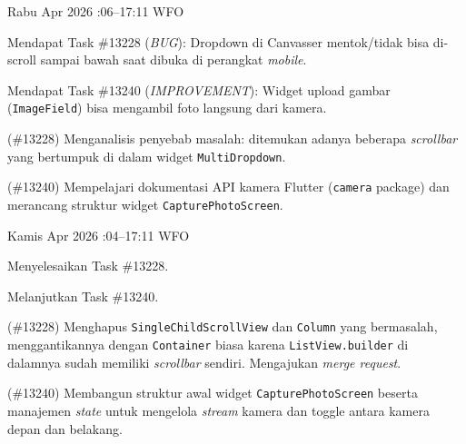 \begin{logtable}
    {
        Rabu  Apr 2026 :06--17:11 \linebreak %
        WFO
    }{
        \begin{loglist}
            \item Mendapat Task \#13228 (\textit{BUG}): Dropdown di Canvasser mentok/tidak bisa
            di-scroll sampai bawah saat dibuka di perangkat \textit{mobile}.
            \item Mendapat Task \#13240 (\textit{IMPROVEMENT}): Widget upload gambar
            (\texttt{ImageField}) bisa mengambil foto langsung dari kamera.
        \end{loglist}
    }{
        \begin{logwork}
            \item (\#13228) Menganalisis penyebab masalah: ditemukan adanya beberapa \textit{scrollbar} yang bertumpuk di dalam widget \texttt{MultiDropdown}.
            \item (\#13240) Mempelajari dokumentasi API kamera Flutter (\texttt{camera} package) dan merancang struktur widget \texttt{CapturePhotoScreen}.
        \end{logwork}
    }

    {
        Kamis  Apr 2026 :04--17:11 \linebreak %
        WFO
    }{
        \begin{loglist}
            \item Menyelesaikan Task \#13228.
            \item Melanjutkan Task \#13240.
        \end{loglist}
    }{
        \begin{logwork}
            \item (\#13228) Menghapus \texttt{SingleChildScrollView} dan \texttt{Column} yang bermasalah, menggantikannya dengan \texttt{Container} biasa karena \texttt{ListView.builder} di dalamnya sudah memiliki \textit{scrollbar} sendiri. Mengajukan \textit{merge request}.
            \item (\#13240) Membangun struktur awal widget \texttt{CapturePhotoScreen} beserta manajemen \textit{state} untuk mengelola \textit{stream} kamera dan toggle antara kamera depan dan belakang.
        \end{logwork}
    }


\end{logtable}
